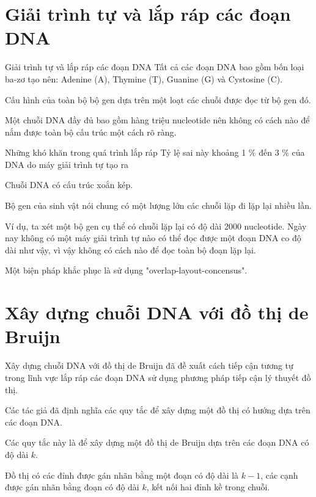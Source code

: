 \documentclass[10pt]{beamer}
\theoremstyle{remark}
\numberwithin{algocf}{section}
\numberwithin{equation}{section}
\numberwithin{dl}{section}
\numberwithin{figure}{section}
\begin{document}
\section{Giải trình tự và lắp ráp các đoạn DNA}

\begin{frame}{Giải trình tự và lắp ráp các đoạn DNA}
    Tất cả các đoạn DNA bao gồm bốn loại ba-zơ tạo nên: Adenine (A), Thymine (T), Guanine (G) và Cystosine (C).

    Cấu hình của toàn bộ bộ gen dựa trên một loạt các chuỗi được đọc từ bộ gen đó.

    Một chuỗi DNA đầy đủ bao gồm hàng triệu nucleotide nên không có cách nào để nắm được toàn bộ cấu trúc một cách rõ ràng.
\end{frame}

\begin{frame}{Những khó khăn trong quá trình lắp ráp}
    Tỷ lệ sai này khoảng 1 \% đến 3 \% của DNA do máy giải trình tự tạo ra

    Chuỗi DNA có cấu trúc xoắn kép.

    Bộ gen của sinh vật nói chung có một lượng lớn các chuỗi lặp đi lặp lại nhiều lần.

    Ví dụ, ta xét một bộ gen cụ thể có chuỗi lặp lại có độ dài 2000 nucleotide. Ngày nay không có một máy giải trình tự nào có thể đọc được một đoạn DNA co độ dài như vậy, vì vậy không có cách nào để đọc toàn bộ đoạn lặp lại.

    Một biện pháp khắc phục là sử dụng "overlap-layout-concensus".
\end{frame}

\section{Xây dựng chuỗi DNA với đồ thị de Bruijn}

\begin{frame}{Xây dựng chuỗi DNA với đồ thị de Bruijn}
    \cite{idury1995new} đã đề xuất cách tiếp cận tương tự trong lĩnh vực lắp ráp các đoạn DNA sử dụng phương pháp tiếp cận lý thuyết đồ thị.

    Các tác giả đã định nghĩa các quy tắc để xây dựng một đồ thị có hướng dựa trên các đoạn DNA.

    Các quy tắc này là để xây dựng một đồ thị de Bruijn dựa trên các đoạn DNA có độ dài $k$.

    Đồ thị có các đỉnh được gán nhãn bằng một đoạn có độ dài là $k-1$, các cạnh được gán nhãn bằng đoạn có độ dài $k$, kết nối hai đỉnh kề trong chuỗi.
\end{frame}
\end{document}
